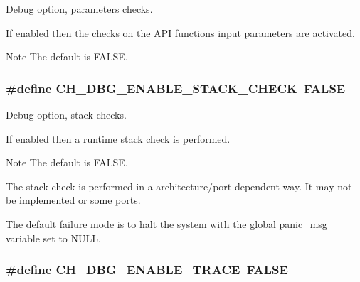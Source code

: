 Debug option, parameters checks. 

If enabled then the checks on the A\+P\+I functions input parameters are activated.

\begin{DoxyNote}{Note}
The default is {\ttfamily F\+A\+L\+S\+E}. 
\end{DoxyNote}
\hypertarget{group__config_gab93d9ee904f15d4f2c26ef2a1394a1d7}{}
\subsubsection[{C\+H\+\_\+\+D\+B\+G\+\_\+\+E\+N\+A\+B\+L\+E\+\_\+\+S\+T\+A\+C\+K\+\_\+\+C\+H\+E\+C\+K}]{\setlength{\rightskip}{0pt plus 5cm}\#define C\+H\+\_\+\+D\+B\+G\+\_\+\+E\+N\+A\+B\+L\+E\+\_\+\+S\+T\+A\+C\+K\+\_\+\+C\+H\+E\+C\+K~F\+A\+L\+S\+E}\label{group__config_gab93d9ee904f15d4f2c26ef2a1394a1d7}


Debug option, stack checks. 

If enabled then a runtime stack check is performed.

\begin{DoxyNote}{Note}
The default is {\ttfamily F\+A\+L\+S\+E}. 

The stack check is performed in a architecture/port dependent way. It may not be implemented or some ports. 

The default failure mode is to halt the system with the global {\ttfamily panic\+\_\+msg} variable set to {\ttfamily N\+U\+L\+L}. 
\end{DoxyNote}
\hypertarget{group__config_ga8bc4cfd861131aeb3c880347d0068229}{}
\subsubsection[{C\+H\+\_\+\+D\+B\+G\+\_\+\+E\+N\+A\+B\+L\+E\+\_\+\+T\+R\+A\+C\+E}]{\setlength{\rightskip}{0pt plus 5cm}\#define C\+H\+\_\+\+D\+B\+G\+\_\+\+E\+N\+A\+B\+L\+E\+\_\+\+T\+R\+A\+C\+E~F\+A\+L\+S\+E}\label{group__config_ga8bc4cfd861131aeb3c880347d0068229}


